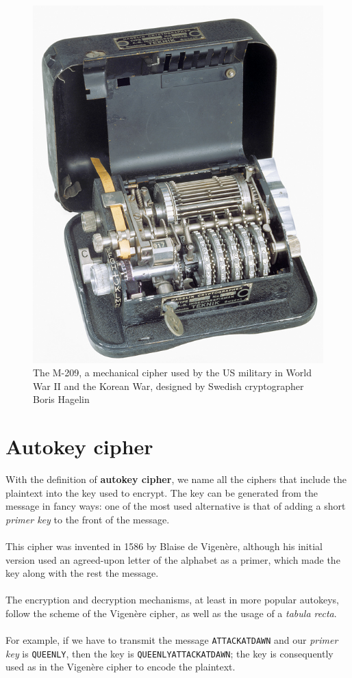 \documentclass[Lau,binding=0.6cm,oneside]{sapthesis}
\begin{document}
\begin{figure}[H]
\includegraphics[scale=0.27]{m-209}
\centering
\caption{The M-209, a mechanical cipher used by the US military in World War II and the Korean War, designed by Swedish cryptographer Boris Hagelin}
\centering
\end{figure}

\section{Autokey cipher}
With the definition of \textbf{autokey cipher}, we name all the ciphers that include the plaintext into the key used to encrypt. The key can be generated from the message in fancy ways: one of the most used alternative is that of adding a short \textit{primer key} to the front of the message.\\\\
This cipher was invented in 1586 by Blaise de Vigenère, although his initial version used an agreed-upon letter of the alphabet as a primer, which made the key along with the rest the message.\\\\
The encryption and decryption mechanisms, at least in more popular autokeys, follow the scheme of the Vigenère cipher, as well as the usage of a \textit{tabula recta}.\\\\
For example, if we have to transmit the message \colorbox{gray!12}{\small{\texttt{ATTACKATDAWN}}} and our \textit{primer key} is \colorbox{gray!12}{\small{\texttt{QUEENLY}}}, then the key is \colorbox{gray!12}{\small{\texttt{QUEENLYATTACKATDAWN}}}; the key is consequently used as in the Vigenère cipher to encode the plaintext.
\end{document}
